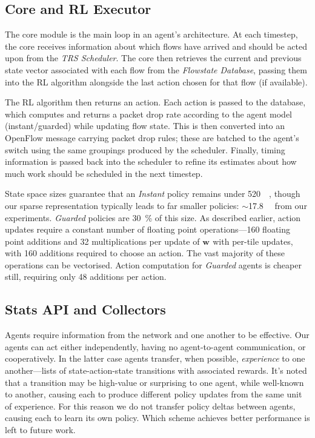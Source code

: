 \documentclass[10pt, times, conference, letterpaper]{IEEEtran}
\newcommand{\wvec}[1]{\ensuremath{\bm{w}_{#1}}}
\begin{document}
\subsection{Core and RL Executor}\label{sec:core-and-rl-executor}
The core module is the main loop in an agent's architecture.
At each timestep, the core receives information about which flows have arrived and should be acted upon from the \emph{TRS Scheduler}.
The core then retrieves the current and previous state vector associated with each flow from the \emph{Flowstate Database}, passing them into the RL algorithm alongside the last action chosen for that flow (if available).

The RL algorithm then returns an action.
Each action is passed to the database, which computes and returns a packet drop rate according to the agent model (instant/guarded) while updating flow state.
This is then converted into an OpenFlow message carrying packet drop rules; these are batched to the agent's switch using the same groupings produced by the scheduler.
Finally, timing information is passed back into the scheduler to refine its estimates about how much work should be scheduled in the next timestep.

State space sizes guarantee that an \emph{Instant} policy remains under \SI{520}{\kibi\byte}, though our sparse representation typically leads to far smaller policies: $\sim$\SI{17.8}{\kibi\byte} from our experiments.
\emph{Guarded} policies are \SI{30}{\percent} of this size.
As described earlier, action updates require a constant number of floating point operations---\num{160} floating point additions and \num{32} multiplications per update of $\wvec{}$ with per-tile updates, with \num{160} additions required to choose an action.
The vast majority of these operations can be vectorised.
Action computation for \emph{Guarded} agents is cheaper still, requiring only \num{48} additions per action.

\subsection{Stats API and Collectors}
Agents require information from the network and one another to be effective.
Our agents can act either independently, having no agent-to-agent communication, or cooperatively.
In the latter case agents transfer, when possible, \emph{experience} to one another---lists of state-action-state transitions with associated rewards.
It's noted that a transition may be high-value or surprising to one agent, while well-known to another, causing each to produce different policy updates from the same unit of experience.
For this reason we do not transfer policy deltas between agents, causing each to learn its own policy.
Which scheme achieves better performance is left to future work.
\end{document}

